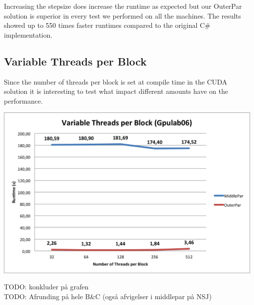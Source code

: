 Increasing the stepsize does increase the runtime as expected but our OuterPar solution is superior in every test we performed on all the machines. The results showed up to 550 times faster runtimes compared to the original C\# implementation.

\subsection{Variable Threads per Block}
Since the number of threads per block is set at compile time in the CUDA solution it is interesting to test what impact different amounts have on the performance.

\begin{center}
	\includegraphics[width=\textwidth]{img/Gpulab-tpb.png}
\end{center}
TODO: konkluder på grafen \\

TODO:
Afrunding på hele B\&C (også afvigelser i middlepar på NSJ)
